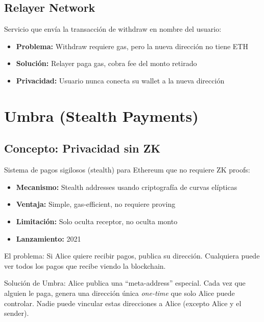 \documentclass[11pt,a4paper,twoside]{book}
\begin{document}
\subsection{Relayer Network}

\begin{definition}[Relayer]
Servicio que env\'ia la transacci\'on de withdraw en nombre del usuario:
\begin{itemize}
    \item \textbf{Problema:} Withdraw requiere gas, pero la nueva direcci\'on no tiene ETH
    \item \textbf{Soluci\'on:} Relayer paga gas, cobra fee del monto retirado
    \item \textbf{Privacidad:} Usuario nunca conecta su wallet a la nueva direcci\'on
\end{itemize}
\end{definition}

\section{Umbra (Stealth Payments)}
\label{sec:umbra}

\subsection{Concepto: Privacidad sin ZK}

\begin{definition}
Sistema de pagos sigilosos (stealth) para Ethereum que no requiere ZK proofs:
\begin{itemize}
    \item \textbf{Mecanismo:} Stealth addresses usando criptograf\'ia de curvas el\'ipticas
    \item \textbf{Ventaja:} Simple, gas-efficient, no requiere proving
    \item \textbf{Limitaci\'on:} Solo oculta receptor, no oculta monto
    \item \textbf{Lanzamiento:} 2021
\end{itemize}
\end{definition}

\begin{intuicion}
El problema: Si Alice quiere recibir pagos, publica su direcci\'on. Cualquiera puede ver todos los pagos que recibe viendo la blockchain.

Soluci\'on de Umbra: Alice publica una ``meta-address'' especial. Cada vez que alguien le paga, genera una direcci\'on \'unica \textit{one-time} que solo Alice puede controlar. Nadie puede vincular estas direcciones a Alice (excepto Alice y el sender).
\end{intuicion}
\end{document}
